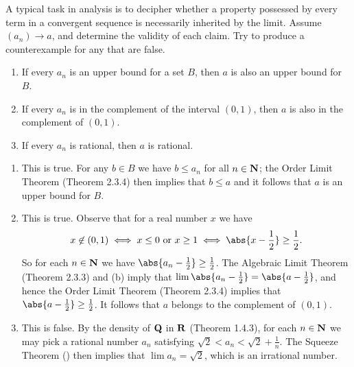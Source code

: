 \documentclass{lew98_solutions}
\begin{document}
\begin{exercise}
\label{ex:2.3.12}
    A typical task in analysis is to decipher whether a property possessed by every term in a convergent sequence is necessarily  inherited by the limit. Assume \( (a_n) \to a \), and determine the validity of each claim. Try to produce a counterexample for any that are false.
    \begin{enumerate}
        \item If every \( a_n \) is an upper bound for a set \( B \), then \( a \) is also an upper bound for \( B \).

        \item If every \( a_n \) is in the complement of the interval \( (0, 1) \), then \( a \) is also in the complement of \( (0, 1) \).

        \item If every \( a_n \) is rational, then \( a \) is rational.
    \end{enumerate}
\end{exercise}

\begin{solution}
    \begin{enumerate}
        \item This is true. For any \( b \in B \) we have \( b \leq a_n \) for all \( n \in \mathbf{N} \); the Order Limit Theorem (Theorem 2.3.4) then implies that \( b \leq a \) and it follows that \( a \) is an upper bound for \( B \).

        \item This is true. Observe that for a real number \( x \) we have
        \[
            x \not\in (0, 1) \iff x \leq 0 \text{ or } x \geq 1 \iff \abs{x - \frac{1}{2}} \geq \frac{1}{2}.
        \]
        So for each \( n \in \mathbf{N} \) we have \( \abs{a_n - \tfrac{1}{2}} \geq \tfrac{1}{2} \). The Algebraic Limit Theorem (Theorem 2.3.3) and  (b) imply that \( \lim \abs{a_n - \tfrac{1}{2}} = \abs{a - \tfrac{1}{2}} \), and hence the Order Limit Theorem (Theorem 2.3.4) implies that \( \abs{a - \tfrac{1}{2}} \geq \tfrac{1}{2} \). It follows that \( a \) belongs to the complement of \( (0, 1) \).

        \item This is false. By the density of \( \mathbf{Q} \) in \( \mathbf{R} \) (Theorem 1.4.3), for each \( n \in \mathbf{N} \) we may pick a rational number \( a_n \) satisfying \( \sqrt{2} < a_n < \sqrt{2} + \tfrac{1}{n} \). The Squeeze Theorem () then implies that \( \lim a_n = \sqrt{2} \), which is an irrational number.
    \end{enumerate}
\end{solution}
\end{document}
